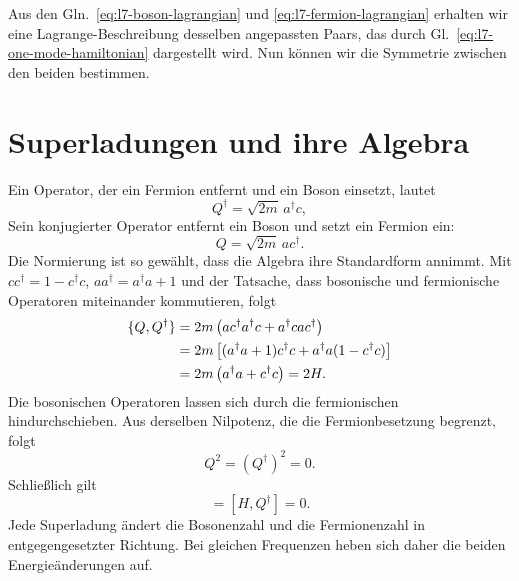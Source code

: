 Aus den Gln.~\eqref{eq:l7-boson-lagrangian} und \eqref{eq:l7-fermion-lagrangian} erhalten wir eine Lagrange-Beschreibung desselben angepassten Paars, das durch Gl.~\eqref{eq:l7-one-mode-hamiltonian} dargestellt wird. Nun können wir die Symmetrie zwischen den beiden bestimmen.

\section{Superladungen und ihre Algebra}

Ein Operator, der ein Fermion entfernt und ein Boson einsetzt, lautet
\begin{equation}
Q^\dagger=\sqrt{2m}\,a^\dagger c,
\end{equation}
Sein konjugierter Operator entfernt ein Boson und setzt ein Fermion ein:
\begin{equation}
Q=\sqrt{2m}\,a c^\dagger.
\end{equation}
Die Normierung ist so gewählt, dass die Algebra ihre Standardform annimmt. Mit \(cc^\dagger=1-c^\dagger c\), \(aa^\dagger=a^\dagger a+1\) und der Tatsache, dass bosonische und fermionische Operatoren miteinander kommutieren, folgt
\begin{align}
\{Q,Q^\dagger\}
&=2m\left(ac^\dagger a^\dagger c+a^\dagger c a c^\dagger\right)\notag\\
&=2m\left[(a^\dagger a+1)c^\dagger c
+a^\dagger a(1-c^\dagger c)\right]\notag\\
&=2m\left(a^\dagger a+c^\dagger c\right)=2H.
\label{eq:l7-superalgebra}
\end{align}
Die bosonischen Operatoren lassen sich durch die fermionischen hindurchschieben. Aus derselben Nilpotenz, die die Fermionbesetzung begrenzt, folgt
\begin{equation}
Q^2=(Q^\dagger)^2=0.
\end{equation}
Schließlich gilt
\begin{equation}
[H,Q]=[H,Q^\dagger]=0.
\label{eq:l7-conserved-supercharges}
\end{equation}
Jede Superladung ändert die Bosonenzahl und die Fermionenzahl in entgegengesetzter Richtung. Bei gleichen Frequenzen heben sich daher die beiden Energieänderungen auf.

\begin{classroomqa}
\end{classroomqa}

